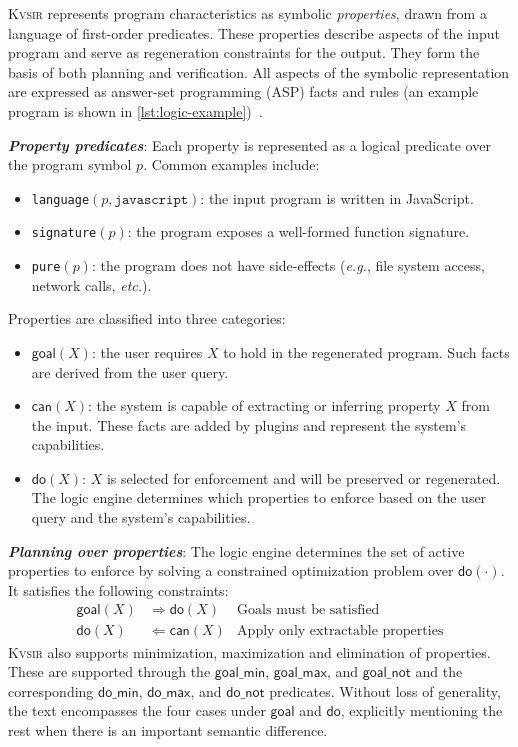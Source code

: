\documentclass[sigplan]{acmart}
\def\eg{{\em e.g.}, }
\def\etc{{\em etc.}\xspace}
\newcommand{\sys}{{\scshape Kv{\textalpha}sir}\xspace}
\newcommand{\heading}[1]{\vspace{2pt}\noindent\textbf{\emph{#1}}:\enspace}
\begin{document}
\sys represents program characteristics as symbolic \emph{properties}, drawn from a language of first-order predicates.
These properties describe aspects of the input program and serve as regeneration constraints for the output.
They form the basis of both planning and verification.
All aspects of the symbolic representation are expressed as answer-set programming (ASP) facts and rules (an example program is shown in \cref{lst:logic-example})~\cite{Eiter_2009}.

\heading{Property predicates}
Each property is represented as a logical predicate over the program symbol $p$. Common examples include:
\begin{itemize}
  \item \texttt{language}$(p, \texttt{javascript})$: the input program is written in JavaScript.
  \item \texttt{signature}$(p)$: the program exposes a well-formed function signature.
  \item \texttt{pure}$(p)$: the program does not have side-effects (\eg file system access, network calls, \etc).
\end{itemize}

Properties are classified into three categories:
\begin{itemize}
  \item $\mathsf{goal}(X)$: the user requires $X$ to hold in the regenerated program. Such facts are derived from the user query.
  \item $\mathsf{can}(X)$: the system is capable of extracting or inferring property $X$ from the input. These facts are added by plugins and represent the system's capabilities.
  \item $\mathsf{do}(X)$: $X$ is selected for enforcement and will be preserved or regenerated. The logic engine determines which properties to enforce based on the user query and the system's capabilities.
\end{itemize}

\heading{Planning over properties}
The logic engine determines the set of active properties to enforce by solving a constrained optimization problem over $\mathsf{do}(\cdot)$. It satisfies the following constraints:
\begin{align*}
  \mathsf{goal}(X) &\Rightarrow \mathsf{do}(X) &\text{Goals must be satisfied} \\
  \mathsf{do}(X) &\Leftarrow \mathsf{can}(X) &\text{Apply only extractable properties}
\end{align*}
\sys also supports minimization, maximization and elimination of properties.
These are supported through the $\mathsf{goal\_min}$, $\mathsf{goal\_max}$, and $\mathsf{goal\_not}$ and the corresponding $\mathsf{do\_min}$, $\mathsf{do\_max}$, and $\mathsf{do\_not}$ predicates.
Without loss of generality, the text encompasses the four cases under $\mathsf{goal}$ and $\mathsf{do}$, explicitly mentioning the rest when there is an important semantic difference.
\end{document}
